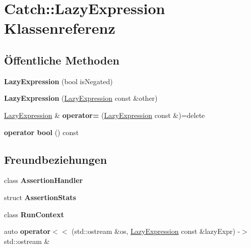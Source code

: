 \hypertarget{classCatch_1_1LazyExpression}{}\section{Catch\+:\+:Lazy\+Expression Klassenreferenz}
\label{classCatch_1_1LazyExpression}
\subsection*{Öffentliche Methoden}
\begin{DoxyCompactItemize}
\item 
\mbox{\label{classCatch_1_1LazyExpression_a47186c2487bd4bf871e870ba8048553a}} 
{\bfseries Lazy\+Expression} (bool is\+Negated)
\item 
\mbox{\label{classCatch_1_1LazyExpression_ab82d5e94df0e159b018fbde0170e46f8}} 
{\bfseries Lazy\+Expression} (\hyperlink{classCatch_1_1LazyExpression}{Lazy\+Expression} const \&other)
\item 
\mbox{\label{classCatch_1_1LazyExpression_ae4ae00d4f36f084c369f2da36565a822}} 
\hyperlink{classCatch_1_1LazyExpression}{Lazy\+Expression} \& {\bfseries operator=} (\hyperlink{classCatch_1_1LazyExpression}{Lazy\+Expression} const \&)=delete
\item 
\mbox{\label{classCatch_1_1LazyExpression_acdb846cb230cecfc6aca7a925b31fbca}} 
{\bfseries operator bool} () const
\end{DoxyCompactItemize}
\subsection*{Freundbeziehungen}
\begin{DoxyCompactItemize}
\item 
\mbox{\label{classCatch_1_1LazyExpression_a4301a3aa57b612dd8b6ef8461742ecab}} 
class {\bfseries Assertion\+Handler}
\item 
\mbox{\label{classCatch_1_1LazyExpression_a64019eb137f5ce447cdc71cb80b6e7a4}} 
struct {\bfseries Assertion\+Stats}
\item 
\mbox{\label{classCatch_1_1LazyExpression_af3aa096bb29a772bc534830f29a2ce7a}} 
class {\bfseries Run\+Context}
\item 
\mbox{\label{classCatch_1_1LazyExpression_aa01086581cab2fcd2d4580b8fa787dfc}} 
auto {\bfseries operator$<$$<$} (std\+::ostream \&os, \hyperlink{classCatch_1_1LazyExpression}{Lazy\+Expression} const \&lazy\+Expr) -\/$>$ std\+::ostream \&
\end{DoxyCompactItemize}



